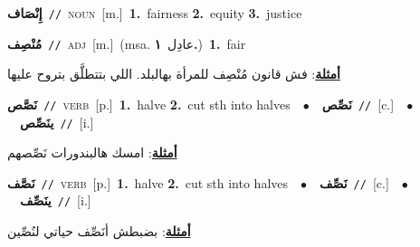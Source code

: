 \documentclass[10pt,a4paper,twoside]{article} %
\begin{document}
\begin{multicols}{2}
{\setlength\topsep{0pt}\textbf{\foreignlanguage{arabic}{إِنْصَاف}}\ {\color{gray}\texttt{//}\color{black}}\ \textsc{noun}\ [m.]\ \textbf{1.}~fairness  \textbf{2.}~equity  \textbf{3.}~justice\ } \vspace{2mm}

{\setlength\topsep{0pt}\textbf{\foreignlanguage{arabic}{مُنْصِف}}\ {\color{gray}\texttt{//}\color{black}}\ \textsc{adj}\ [m.]\ \color{gray}(msa. \foreignlanguage{arabic}{عادِل}~\foreignlanguage{arabic}{\textbf{١.}})\color{black}\ \textbf{1.}~fair\  \begin{flushright}\color{gray}\foreignlanguage{arabic}{\textbf{\underline{\foreignlanguage{arabic}{أمثلة}}}: فش قانون مُنْصِف للمرأة بهالبلد. اللي بتتطلَّق بتروح عليها}\end{flushright}\color{black}} \vspace{2mm}

{\setlength\topsep{0pt}\textbf{\foreignlanguage{arabic}{نَصَّص}}\ {\color{gray}\texttt{//}\color{black}}\ \textsc{verb}\ [p.]\ \textbf{1.}~halve  \textbf{2.}~cut sth into halves\ \ $\bullet$\ \ \setlength\topsep{0pt}\textbf{\foreignlanguage{arabic}{نَصِّص}}\ {\color{gray}\texttt{//}\color{black}}\ [c.]\ \ $\bullet$\ \ \setlength\topsep{0pt}\textbf{\foreignlanguage{arabic}{ينَصِّص}}\ {\color{gray}\texttt{//}\color{black}}\ [i.]\  \begin{flushright}\color{gray}\foreignlanguage{arabic}{\textbf{\underline{\foreignlanguage{arabic}{أمثلة}}}: امسك هالبندورات نَصِّصهم}\end{flushright}\color{black}} \vspace{2mm}

{\setlength\topsep{0pt}\textbf{\foreignlanguage{arabic}{نَصَّف}}\ {\color{gray}\texttt{//}\color{black}}\ \textsc{verb}\ [p.]\ \textbf{1.}~halve  \textbf{2.}~cut sth into halves\ \ $\bullet$\ \ \setlength\topsep{0pt}\textbf{\foreignlanguage{arabic}{نَصِّف}}\ {\color{gray}\texttt{//}\color{black}}\ [c.]\ \ $\bullet$\ \ \setlength\topsep{0pt}\textbf{\foreignlanguage{arabic}{ينَصِّف}}\ {\color{gray}\texttt{//}\color{black}}\ [i.]\  \begin{flushright}\color{gray}\foreignlanguage{arabic}{\textbf{\underline{\foreignlanguage{arabic}{أمثلة}}}: بضبطش أنَصِّف حياتي لنُصِّين}\end{flushright}\color{black}} \vspace{2mm}


\end{multicols}
\end{document}
